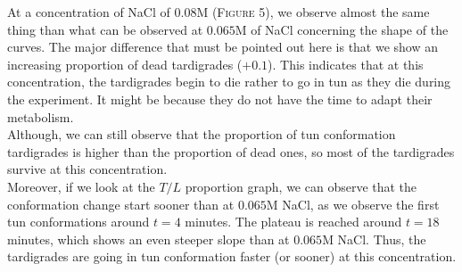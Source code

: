 \documentclass[12pt,a4paper, twocolumn]{article}
\begin{document}
At a concentration of NaCl of $0.08$M (\textsc{Figure} 5), we observe almost the same thing than what can be observed at $0.065$M of NaCl concerning the shape of the curves. The major difference that must be pointed out here is that we show an increasing proportion of dead tardigrades ($+0.1$). This indicates that at this concentration, the tardigrades begin to die rather to go in tun as they die during the experiment. It might be because they do not have the time to adapt their metabolism. \\
Although, we can still observe that the proportion of tun conformation tardigrades is higher than the proportion of dead ones, so most of the tardigrades survive at this concentration.\\
Moreover, if we look at the $T/L$ proportion graph, we can observe that the conformation change start sooner than at $0.065$M NaCl, as we observe the first tun conformations around $t=4$ minutes. The plateau is reached around $t=18$ minutes, which shows an even steeper slope than at $0.065$M NaCl. Thus, the tardigrades are going in tun conformation faster (or sooner) at this concentration.
\end{document}
